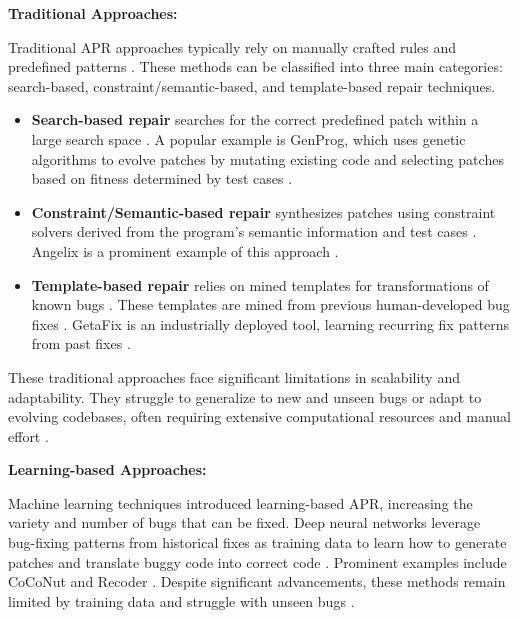 \textbf{Traditional Approaches:}

Traditional APR approaches typically rely on manually crafted rules and predefined patterns \cite{liuMarsCodeAgentAInative2024, xiaAutomatedProgramRepair2023, yinThinkRepairSelfDirectedAutomated2024}. These methods can be classified into three main categories: search-based, constraint/semantic-based, and template-based repair techniques.

\begin{itemize}
    \item \textbf{Search-based repair} searches for the correct predefined patch within a large search space \cite{liuMarsCodeAgentAInative2024, huCanGPTO1Kill2024, zhangPATCHEmpoweringLarge2025}. A popular example is GenProg, which uses genetic algorithms to evolve patches by mutating existing code and selecting patches based on fitness determined by test cases \cite{legouesGenProgGenericMethod2012}.

    \item \textbf{Constraint/Semantic-based repair} synthesizes patches using constraint solvers derived from the program's semantic information and test cases \cite{liuMarsCodeAgentAInative2024, mechtaevAngelixScalableMultiline2016}. Angelix is a prominent example of this approach \cite{mechtaevAngelixScalableMultiline2016}.

    \item \textbf{Template-based repair} relies on mined templates for transformations of known bugs \cite{xiaAutomatedProgramRepair2023}. These templates are mined from previous human-developed bug fixes \cite{xiaAutomatedProgramRepair2023, yinThinkRepairSelfDirectedAutomated2024}. GetaFix is an industrially deployed tool, learning recurring fix patterns from past fixes \cite{baderGetafixLearningFix2019}.
\end{itemize}

These traditional approaches face significant limitations in scalability and adaptability. They struggle to generalize to new and unseen bugs or adapt to evolving codebases, often requiring extensive computational resources and manual effort \cite{puvvadiCodingAgentsComprehensive2025, xiaAutomatedProgramRepair2024}.

\textbf{Learning-based Approaches:}

Machine learning techniques introduced learning-based APR, increasing the variety and number of bugs that can be fixed. Deep neural networks leverage bug-fixing patterns from historical fixes as training data to learn how to generate patches and translate buggy code into correct code \cite{xiaAutomatedProgramRepair2023, tangLargeLanguageModels2024}. Prominent examples include CoCoNut \cite{lutellierCoCoNuTCombiningContextaware2020} and Recoder \cite{zhuSyntaxguidedEditDecoder2021}. Despite significant advancements, these methods remain limited by training data and struggle with unseen bugs \cite{xiaLessTrainingMore2022}.

